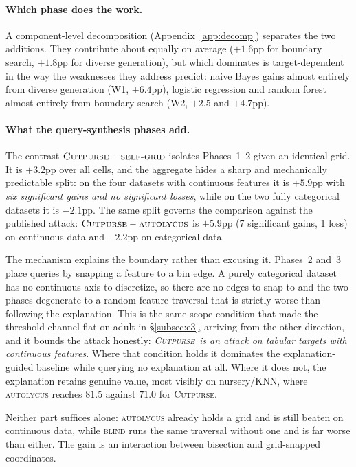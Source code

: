 \documentclass[sigconf,anonymous,review]{acmart}
\newcommand{\sys}{\textsc{Cutpurse}}
\begin{document}
\paragraph{Which phase does the work.} A component-level decomposition
(Appendix~\ref{app:decomp}) separates the two additions. They contribute about equally on average
($+1.6$pp for boundary search, $+1.8$pp for diverse generation), but which dominates is
target-dependent in the way the weaknesses they address predict: naive Bayes gains almost entirely
from diverse generation (W1, $+6.4$pp), logistic regression and random forest almost entirely from
boundary search (W2, $+2.5$ and $+4.7$pp).

\paragraph{What the query-synthesis phases add.} The contrast
$\sys-\textsc{self-grid}$ isolates Phases~1--2 given an identical grid. It is
$+3.2$pp over all cells, and the aggregate hides a sharp and
mechanically predictable split: on the four datasets with continuous features it is $+5.9$pp with
\emph{six significant gains and no significant losses}, while on the two fully categorical datasets it
is $-2.1$pp. The same split governs the comparison against the published attack:
$\sys-\textsc{autolycus}$ is $+5.9$pp (7 significant gains, 1 loss) on continuous data
and $-2.2$pp on categorical data.

The mechanism explains the boundary rather than excusing it. Phases~2 and~3 place queries by snapping
a feature to a bin edge. A purely categorical dataset has no continuous axis to discretize, so there
are no edges to snap to and the two phases degenerate to a random-feature traversal that is strictly
worse than following the explanation. This is the same scope condition that made the threshold channel
flat on adult in \S\ref{subsec:e3}, arriving from the other direction, and it bounds the attack
honestly: \emph{\sys\ is an attack on tabular targets with continuous features}. Where
that condition holds it dominates the explanation-guided baseline while querying no explanation at all. Where it does not, the explanation retains genuine value, most visibly on nursery/KNN, where
\textsc{autolycus} reaches $81.5$ against $71.0$ for \sys.

Neither part suffices alone: \textsc{autolycus} already holds a grid and is still beaten on
continuous data, while \textsc{blind} runs the same traversal without one and is far worse than
either. The gain is an interaction between bisection and grid-snapped coordinates.
\end{document}
